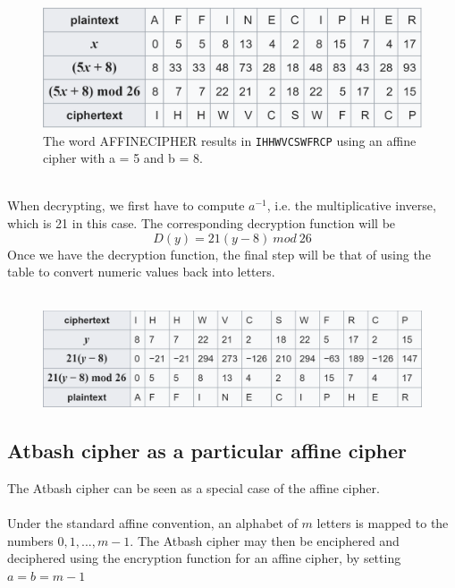 \documentclass[Lau,binding=0.6cm,oneside]{sapthesis}
\begin{document}
\begin{figure}[H]
\includegraphics[scale=0.5]{affine_encrypt}
\captionsetup{justification=centering, margin=2cm}
\centering
\caption{The word \textsf{AFFINECIPHER} results in \texttt{IHHWVCSWFRCP} using an affine cipher with a = 5 and b = 8.}
\centering
\end{figure}
\ \\
When decrypting, we first have to compute $a^{-1}$, i.e. the multiplicative inverse, which is 21 in this case. The corresponding decryption function will be 
\begin{equation}
D{(y)} = 21(y-8) \ mod \ 26
\end{equation}
Once we have the decryption function, the final step will be that of using the table to convert numeric values back into letters.\\\\

\begin{figure}[H]
\includegraphics[scale=0.68]{affine_decrypt}
\centering
\caption{}
\centering
\end{figure}	

\subsection{Atbash cipher as a particular affine cipher}
The Atbash cipher can be seen as a special case of the affine cipher.\\\\
Under the standard affine convention, an alphabet of $m$ letters is mapped to the numbers $0,1, ..., m-1$. The Atbash cipher may then be enciphered and deciphered using the encryption function for an affine cipher, by setting $a=b=m-1$
\end{document}
